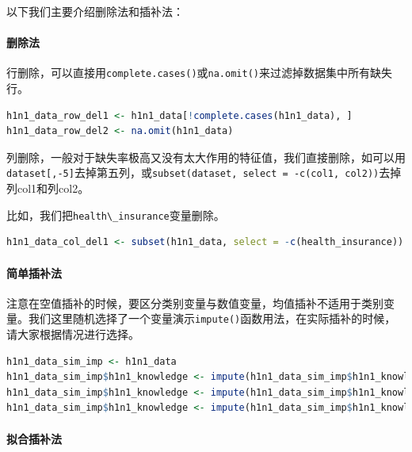 \documentclass[]{ctexbook}
\let\oldparagraph\paragraph
\renewcommand{\paragraph}[1]{\oldparagraph{#1}\mbox{}}
\newcommand{\passthrough}[1]{#1}
\begin{document}
以下我们主要介绍删除法和插补法：

\hypertarget{ux5220ux9664ux6cd5}{%
\paragraph{删除法}\label{ux5220ux9664ux6cd5}}

行删除，可以直接用\passthrough{\lstinline!complete.cases()!}或\passthrough{\lstinline!na.omit()!}来过滤掉数据集中所有缺失行。

\begin{lstlisting}[language=R]
h1n1_data_row_del1 <- h1n1_data[!complete.cases(h1n1_data), ]
h1n1_data_row_del2 <- na.omit(h1n1_data)
\end{lstlisting}

列删除，一般对于缺失率极高又没有太大作用的特征值，我们直接删除，如可以用\passthrough{\lstinline!dataset[,-5]!}去掉第五列，或\passthrough{\lstinline!subset(dataset, select = -c(col1, col2))!}去掉列col1和列col2。

比如，我们把\passthrough{\lstinline!health\_insurance!}变量删除。

\begin{lstlisting}[language=R]
h1n1_data_col_del1 <- subset(h1n1_data, select = -c(health_insurance))
\end{lstlisting}

\hypertarget{ux7b80ux5355ux63d2ux8865ux6cd5}{%
\paragraph{简单插补法}\label{ux7b80ux5355ux63d2ux8865ux6cd5}}

注意在空值插补的时候，要区分类别变量与数值变量，均值插补不适用于类别变量。我们这里随机选择了一个变量演示\passthrough{\lstinline!impute()!}函数用法，在实际插补的时候，请大家根据情况进行选择。

\begin{lstlisting}[language=R]
h1n1_data_sim_imp <- h1n1_data
h1n1_data_sim_imp$h1n1_knowledge <- impute(h1n1_data_sim_imp$h1n1_knowledge, 1) # 填充特定值
h1n1_data_sim_imp$h1n1_knowledge <- impute(h1n1_data_sim_imp$h1n1_knowledge, median) # 插补中位数
h1n1_data_sim_imp$h1n1_knowledge <- impute(h1n1_data_sim_imp$h1n1_knowledge, mean) # 插补均值
\end{lstlisting}

\hypertarget{ux62dfux5408ux63d2ux8865ux6cd5}{%
\paragraph{拟合插补法}\label{ux62dfux5408ux63d2ux8865ux6cd5}}
\end{document}
